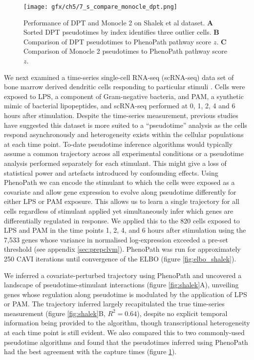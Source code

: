 \begin{figure}
   \texttt{[image: gfx/ch5/7\_s\_compare\_monocle\_dpt.png]}
   \caption{Performance of DPT and Monocle 2 on Shalek et al dataset.
\textbf{A} Sorted DPT pseudotimes by index identifies three outlier cells. \textbf{B} Comparison of DPT pseudotimes to PhenoPath pathway score $z$. \textbf{C} Comparison of Monocle 2 pseudotimes to PhenoPath pathway score $z$.}
	\label{fig:shalek_comparison}
\end{figure}

We next examined a time-series single-cell RNA-seq (scRNA-seq) data set of bone marrow derived dendritic cells responding to particular stimuli \cite{Shalek2014-cg}. Cells were exposed to LPS, a component of Gram-negative bacteria, and PAM, a synthetic mimic of bacterial lipopeptides, and scRNA-seq performed at 0, 1, 2, 4 and 6 hours after stimulation. Despite the time-series measurement, previous studies have suggested this dataset is more suited to a ``pseudotime'' analysis as the cells respond asynchronously and heterogeneity exists within the cellular populations at each time point\cite{Reid2016-yo}. To-date pseudotime inference algorithms would typically assume a common trajectory across all experimental conditions or a pseudotime analysis  performed separately for each stimulant. This might give a loss of statistical power and artefacts introduced by confounding effects. Using PhenoPath we can encode the stimulant to which the cells were exposed as a covariate and allow gene expression to evolve along pseudotime differently for either LPS or PAM exposure. This allows us to learn a single trajectory for all cells regardless of stimulant applied yet simultaneously infer which genes are differentially regulated in response. We applied this to the 820 cells exposed to LPS and PAM in the time points 1, 2, 4, and 6 hours after stimulation using the 7,533 genes whose variance in normalised log-expression exceeded a pre-set threshold (see appendix \ref{sec:prepclvm}). PhenoPath was run for approximately 250 CAVI iterations until convergence of the ELBO (figure \ref{fig:elbo_shalek}).

We inferred a covariate-perturbed trajectory using PhenoPath and uncovered a landscape of pseudotime-stimulant interactions (figure \ref{fig:shalek}A), unveiling genes whose regulation along pseudotime is modulated by the application of LPS or PAM. The trajectory inferred largely recapitulated the true time-series measurement (figure \ref{fig:shalek}B, $R^2 = 0.64$), despite no explicit temporal information being provided to the algorithm, though transcriptional heterogeneity at each time point is still evident. We also compared this to two commonly-used pseudotime algorithms and found that the pseudotimes inferred using PhenoPath had the best agreement with the capture times (figure \ref{fig:shalek_comparison}).


